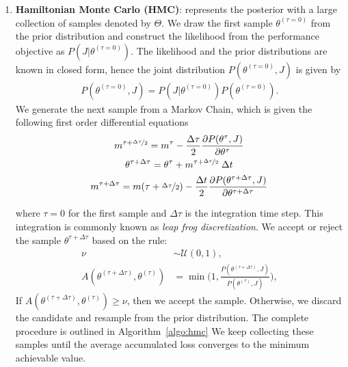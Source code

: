 \begin{enumerate}
    \item \textbf{Hamiltonian Monte Carlo (HMC)}: represents the posterior with
    a large collection of samples denoted by $\Theta$.
    We draw the first sample $\theta^{(\tau=0)}$ from the prior distribution and
    construct the likelihood from the performance objective as $P(J |
    \theta^{(\tau=0)})$.
    The likelihood and the prior distributions are known in closed form, hence
    the joint distribution $P(\theta^{(\tau=0)}, J)$ is given by
    \begin{align*}
        P(\theta^{(\tau=0)}, J) = P(J|\theta^{(\tau=0)})P(\theta^{(\tau=0)}).
    \end{align*}
    We generate the next sample from a Markov Chain, which is given the
    following first order differential equations~\cite{bishop2006pattern}
    \begin{equation}
        \begin{gathered}
            m^{\tau + \nicefrac{\Delta \tau}{2}} = m^{\tau} - \dfrac{\Delta \tau}{2} \dfrac{\partial P(\theta^{\tau}, J)}{\partial \theta^{\tau}} \\
            \theta^{\tau + \Delta \tau} = \theta^{\tau} + m^{\tau + \nicefrac{\Delta \tau}{2}} \; \Delta t \\
            m^{\tau + \Delta \tau} = m(\tau + \nicefrac{\Delta \tau}{2}) - \dfrac{\Delta t}{2}\dfrac{\partial P(\theta^{\tau + \Delta \tau}, J)}{\partial \theta^{\tau + \Delta \tau}}
        \end{gathered}
        \label{eq:leapfrog}
    \end{equation}

    \noindent where $\tau=0$ for the first sample and $\Delta \tau$ is the integration time step. 
    This integration is commonly known as \textit{leap frog discretization}.
    We accept or reject the sample $\theta^{\tau + \Delta \tau}$ based on the rule:
    \begin{align*}
        \nu &\sim \mathcal{U}(0, 1), \\
        A(\theta^{(\tau + \Delta \tau)}, \theta^{(\tau)}) &= \min \Biggl(1, \frac{P(\theta^{(\tau + \Delta \tau)}, J)}{P(\theta^{(\tau)}, J)} \Biggr),
    \end{align*} 
    If $A(\theta^{(\tau + \Delta \tau)}, \theta^{(\tau)}) \geq \nu$, then we accept the sample. 
    Otherwise, we discard the candidate and resample from the prior
    distribution.
    The complete procedure is outlined in Algorithm~\eqref{algo:hmc}
    We keep collecting these samples until the average accumulated loss
    converges to the minimum achievable value. 


\end{enumerate}
